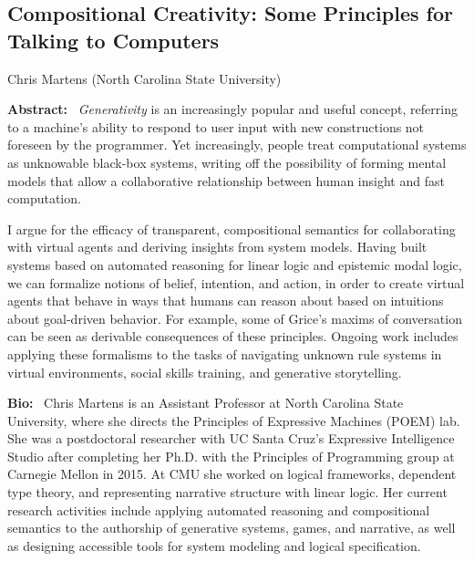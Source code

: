 \label{Keynotes}

\def\talktitle#1{\subsection*{#1}}
\def\speaker#1#2{\begin{flushleft} #1 (#2) \end{flushleft}}

\talktitle{Compositional Creativity: Some Principles for Talking to Computers}
\speaker{Chris Martens}{North Carolina State University}
\def\talkabstract{\noindent \textbf{Abstract:}~}
\def\bio{\medskip\noindent \textbf{Bio:}~}

\talkabstract
\emph{Generativity} is an increasingly popular and useful concept, referring to a machine’s ability to respond to user input with new constructions not foreseen by the programmer. Yet increasingly, people treat computational systems as unknowable black-box systems, writing off the possibility of forming mental models that allow a collaborative relationship between human insight and fast computation. 

I argue for the efficacy of transparent, compositional semantics for collaborating with virtual agents and deriving insights from system models. Having built systems based on automated reasoning for linear logic and epistemic modal logic, we can formalize notions of belief, intention, and action, in order to create virtual agents that behave in ways that humans can reason about based on intuitions about goal-driven behavior. For example, some of Grice’s maxims of conversation can be seen as derivable consequences of these principles. Ongoing work includes applying these formalisms to the tasks of navigating unknown rule systems in virtual environments, social skills training, and generative storytelling.

\bio
Chris Martens is an Assistant Professor at North Carolina State University, where she directs the Principles of Expressive Machines (POEM) lab. She was a postdoctoral researcher with UC Santa Cruz’s Expressive Intelligence Studio after completing her Ph.D. with the Principles of Programming group at Carnegie Mellon in 2015. At CMU she worked on logical frameworks, dependent type theory, and representing narrative structure with linear logic. Her current research activities include applying automated reasoning and compositional semantics to the authorship of generative systems, games, and narrative, as well as designing accessible tools for system modeling and logical specification.

